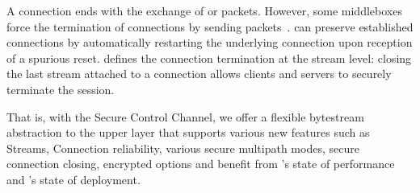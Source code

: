 A \tcp connection ends with the exchange of \fin or \rst packets. However, some
middleboxes force the termination of \tcp connections by sending \rst
packets~\cite{rfc3360,weaver2009detecting}. \tcpls can preserve established
connections by automatically restarting the underlying \tcp connection upon
reception of a spurious reset. \tcpls defines the connection termination at the
stream level: closing the last stream attached to a \tcp connection allows
clients and servers to securely terminate the \tcpls session.

That is, with the Secure Control Channel, we offer a flexible bytestream
abstraction to the upper layer that supports various new features such as
Streams, Connection reliability, various secure multipath modes, secure
connection closing,  encrypted \tcp options and benefit from \tcp's state of performance and \tls's state of deployment.


